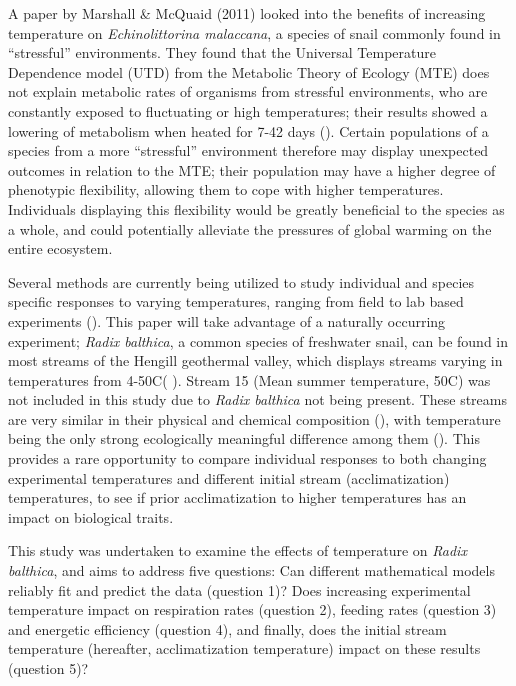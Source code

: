 \documentclass[../../Paper.tex]{subfiles}
\begin{document}
A paper by Marshall \& McQuaid (2011) looked into the 
benefits of increasing temperature on \textit{Echinolittorina malaccana}, a species of snail 
commonly found in ``stressful'' environments. They found that the Universal Temperature 
Dependence model (UTD) from the Metabolic Theory of Ecology (MTE) does not explain metabolic rates 
of organisms from stressful environments, who are constantly exposed to fluctuating or high 
temperatures; their results showed a lowering of metabolism when heated for 7-42 days 
(\cite{marshall_warming_2011}). Certain populations of a species from a more ``stressful'' 
environment therefore may display unexpected outcomes in relation to the MTE; their 
population may have a higher degree of phenotypic flexibility, allowing them to cope with 
higher temperatures. Individuals  displaying this flexibility would be 
greatly beneficial to the species as a whole, and could potentially alleviate the 
pressures of global warming on the entire ecosystem.

Several methods are currently being utilized to study individual and species specific responses
to varying temperatures, ranging from field to lab based experiments (\cite{schulte_thermal_2011,brusch_turn_2016}).
This paper will take advantage of a naturally occurring experiment; \textit{Radix balthica}, a common
species of freshwater snail, can be found in most streams of the Hengill geothermal valley, which
displays streams varying in temperatures from 4-50\degree C(
\cite{friberg_relationships_2009,ogorman_chapter_2012}). Stream 15 (Mean summer temperature, 50\degree C) was not included in this study
due to \textit{Radix balthica} not being present. These streams are very similar in their physical and chemical 
composition (\cite{ogorman_chapter_2012}), with temperature being the only strong 
ecologically meaningful difference among them (\cite{friberg_relationships_2009}). This provides a rare opportunity
to compare individual responses to both changing experimental temperatures and different initial stream (acclimatization) temperatures, to see if 
prior acclimatization to higher temperatures has an impact on biological traits. 

This study was undertaken to examine the effects of temperature on \textit{Radix balthica}, and
aims to address five questions: Can different mathematical models reliably fit and predict the data (question 1)?
Does increasing experimental 
temperature impact on respiration rates (question 2), feeding rates (question 3) and energetic 
efficiency (question 4), and finally, does the initial stream temperature (hereafter, acclimatization temperature) impact on these results (question 5)?
\end{document}
